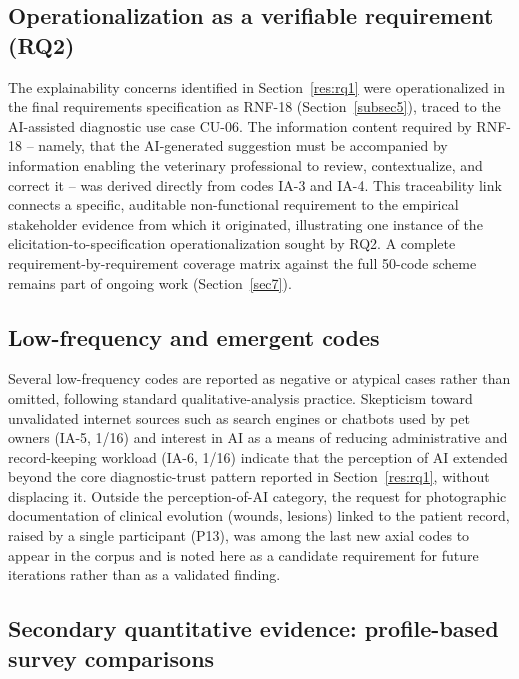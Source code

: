 \documentclass[pdflatex,sn-mathphys-num,Numbered]{sn-jnl}
\begin{document}
\subsection{Operationalization as a verifiable requirement (RQ2)}\label{res:rq2}

The explainability concerns identified in Section~\ref{res:rq1} were operationalized in the final requirements specification as RNF-18 (Section~\ref{subsec5}), traced to the AI-assisted diagnostic use case CU-06. The information content required by RNF-18 -- namely, that the AI-generated suggestion must be accompanied by information enabling the veterinary professional to review, contextualize, and correct it -- was derived directly from codes IA-3 and IA-4. This traceability link connects a specific, auditable non-functional requirement to the empirical stakeholder evidence from which it originated, illustrating one instance of the elicitation-to-specification operationalization sought by RQ2. A complete requirement-by-requirement coverage matrix against the full 50-code scheme remains part of ongoing work (Section~\ref{sec7}).

\subsection{Low-frequency and emergent codes}\label{res:emergent}

Several low-frequency codes are reported as negative or atypical cases rather than omitted, following standard qualitative-analysis practice. Skepticism toward unvalidated internet sources such as search engines or chatbots used by pet owners (IA-5, 1/16) and interest in AI as a means of reducing administrative and record-keeping workload (IA-6, 1/16) indicate that the perception of AI extended beyond the core diagnostic-trust pattern reported in Section~\ref{res:rq1}, without displacing it. Outside the perception-of-AI category, the request for photographic documentation of clinical evolution (wounds, lesions) linked to the patient record, raised by a single participant (P13), was among the last new axial codes to appear in the corpus and is noted here as a candidate requirement for future iterations rather than as a validated finding.

\subsection{Secondary quantitative evidence: profile-based survey comparisons}\label{res:survey}
\end{document}
